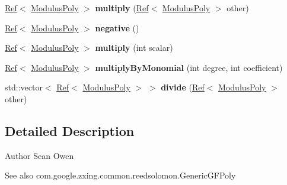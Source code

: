 \begin{DoxyCompactItemize}
\item 
\mbox{\label{classzxing_1_1pdf417_1_1decoder_1_1ec_1_1_modulus_poly_ae4daef81f4d0e3cb0c6b17d330f4e401}} 
\mbox{\hyperlink{classzxing_1_1_ref}{Ref}}$<$ \mbox{\hyperlink{classzxing_1_1pdf417_1_1decoder_1_1ec_1_1_modulus_poly}{Modulus\+Poly}} $>$ {\bfseries multiply} (\mbox{\hyperlink{classzxing_1_1_ref}{Ref}}$<$ \mbox{\hyperlink{classzxing_1_1pdf417_1_1decoder_1_1ec_1_1_modulus_poly}{Modulus\+Poly}} $>$ other)
\item 
\mbox{\label{classzxing_1_1pdf417_1_1decoder_1_1ec_1_1_modulus_poly_a8d81d27a1d02928c02936f01dbde3bf2}} 
\mbox{\hyperlink{classzxing_1_1_ref}{Ref}}$<$ \mbox{\hyperlink{classzxing_1_1pdf417_1_1decoder_1_1ec_1_1_modulus_poly}{Modulus\+Poly}} $>$ {\bfseries negative} ()
\item 
\mbox{\label{classzxing_1_1pdf417_1_1decoder_1_1ec_1_1_modulus_poly_a6ca7779c961202690b63d3145953c101}} 
\mbox{\hyperlink{classzxing_1_1_ref}{Ref}}$<$ \mbox{\hyperlink{classzxing_1_1pdf417_1_1decoder_1_1ec_1_1_modulus_poly}{Modulus\+Poly}} $>$ {\bfseries multiply} (int scalar)
\item 
\mbox{\label{classzxing_1_1pdf417_1_1decoder_1_1ec_1_1_modulus_poly_a1f38f7f97bfe995ede6ab57200f70d3b}} 
\mbox{\hyperlink{classzxing_1_1_ref}{Ref}}$<$ \mbox{\hyperlink{classzxing_1_1pdf417_1_1decoder_1_1ec_1_1_modulus_poly}{Modulus\+Poly}} $>$ {\bfseries multiply\+By\+Monomial} (int degree, int coefficient)
\item 
\mbox{\label{classzxing_1_1pdf417_1_1decoder_1_1ec_1_1_modulus_poly_ad165da605e72f60aaca6d9e8d92b9002}} 
std\+::vector$<$ \mbox{\hyperlink{classzxing_1_1_ref}{Ref}}$<$ \mbox{\hyperlink{classzxing_1_1pdf417_1_1decoder_1_1ec_1_1_modulus_poly}{Modulus\+Poly}} $>$ $>$ {\bfseries divide} (\mbox{\hyperlink{classzxing_1_1_ref}{Ref}}$<$ \mbox{\hyperlink{classzxing_1_1pdf417_1_1decoder_1_1ec_1_1_modulus_poly}{Modulus\+Poly}} $>$ other)
\end{DoxyCompactItemize}


\subsection{Detailed Description}
\begin{DoxyAuthor}{Author}
Sean Owen 
\end{DoxyAuthor}
\begin{DoxySeeAlso}{See also}
com.\+google.\+zxing.\+common.\+reedsolomon.\+Generic\+G\+F\+Poly 
\end{DoxySeeAlso}


